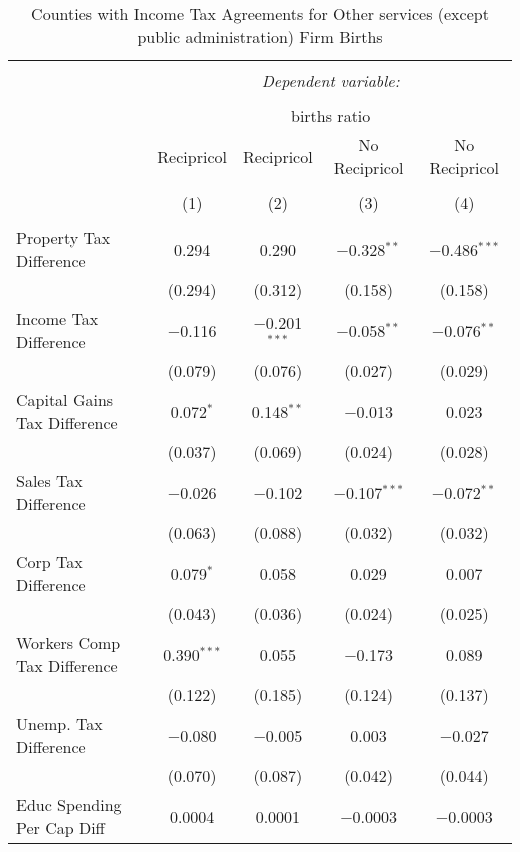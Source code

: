 
\begin{table}[!htbp] \centering 
  \caption{Counties with Income Tax Agreements for  Other services (except public administration) Firm Births} 
  \label{81rd} 
\begin{tabular}{@{\extracolsep{5pt}}lcccc} 
\\[-1.8ex]\hline 
\hline \\[-1.8ex] 
 & \multicolumn{4}{c}{\textit{Dependent variable:}} \\ 
\cline{2-5} 
\\[-1.8ex] & \multicolumn{4}{c}{births ratio} \\ 
 & Recipricol & Recipricol & No Recipricol & No Recipricol \\ 
\\[-1.8ex] & (1) & (2) & (3) & (4)\\ 
\hline \\[-1.8ex] 
 Property Tax Difference & 0.294 & 0.290 & $-$0.328$^{**}$ & $-$0.486$^{***}$ \\ 
  & (0.294) & (0.312) & (0.158) & (0.158) \\ 
  Income Tax Difference & $-$0.116 & $-$0.201$^{***}$ & $-$0.058$^{**}$ & $-$0.076$^{**}$ \\ 
  & (0.079) & (0.076) & (0.027) & (0.029) \\ 
  Capital Gains Tax Difference & 0.072$^{*}$ & 0.148$^{**}$ & $-$0.013 & 0.023 \\ 
  & (0.037) & (0.069) & (0.024) & (0.028) \\ 
  Sales Tax Difference & $-$0.026 & $-$0.102 & $-$0.107$^{***}$ & $-$0.072$^{**}$ \\ 
  & (0.063) & (0.088) & (0.032) & (0.032) \\ 
  Corp Tax Difference & 0.079$^{*}$ & 0.058 & 0.029 & 0.007 \\ 
  & (0.043) & (0.036) & (0.024) & (0.025) \\ 
  Workers Comp Tax Difference & 0.390$^{***}$ & 0.055 & $-$0.173 & 0.089 \\ 
  & (0.122) & (0.185) & (0.124) & (0.137) \\ 
  Unemp. Tax Difference & $-$0.080 & $-$0.005 & 0.003 & $-$0.027 \\ 
  & (0.070) & (0.087) & (0.042) & (0.044) \\ 
  Educ Spending Per Cap Diff & 0.0004 & 0.0001 & $-$0.0003 & $-$0.0003 \\ 

\end{tabular}
\end{table}
